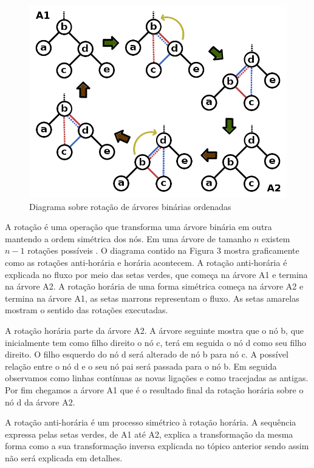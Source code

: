 \begin{figure}[H]
	\caption{\label{gram_cls}Diagrama sobre rotação de árvores binárias ordenadas}
	\begin{center}
	    \includegraphics[scale=0.4]{tree_rotations.png}
	\end{center}
\end{figure}

A rotação é uma operação que transforma uma árvore binária em outra mantendo a ordem simétrica dos nós. Em uma árvore de tamanho $n$ existem $n-1$ rotações possíveis \cite{binTree}. O diagrama contido na Figura 3 mostra graficamente como as rotações anti-horária e horária acontecem. A rotação anti-horária é explicada no fluxo por meio das setas verdes, que começa na árvore A1 e termina na árvore A2. A rotação horária de uma forma simétrica começa na árvore A2 e termina na árvore A1, as setas marrons representam o fluxo. As setas amarelas mostram o sentido das rotações executadas.

A rotação horária parte da árvore A2. A árvore seguinte mostra que o nó b, que inicialmente tem como filho direito o nó c, terá em seguida o nó d como seu filho direito. O filho esquerdo do nó d será alterado de nó b para nó c. A possível relação entre o nó d e o seu nó pai será passada para o nó b. Em seguida observamos como linhas contínuas as novas ligações e como tracejadas as antigas. Por fim chegamos a árvore A1 que é o resultado final da rotação horária sobre o nó d da árvore A2.

A rotação anti-horária é um processo simétrico à rotação horária. A sequência expressa pelas setas verdes, de A1 até A2, explica a transformação da mesma forma como a sua transformação inversa explicada no tópico anterior sendo assim não será explicada em detalhes.

